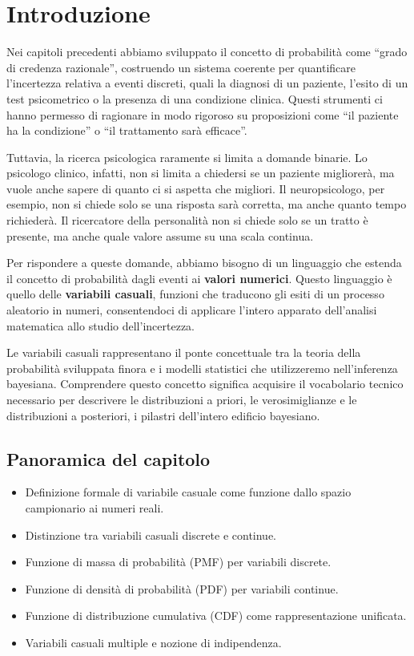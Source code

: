 \documentclass[
  letterpaper,
  DIV=11,
  numbers=noendperiod,
  oneside]{scrreprt}
\providecommand{\tightlist}{%
  \setlength{\itemsep}{0pt}\setlength{\parskip}{0pt}}
\theoremstyle{definition}
\theoremstyle{plain}
\theoremstyle{definition}
\theoremstyle{remark}
\begin{document}
\section*{Introduzione}\label{introduzione-6}


Nei capitoli precedenti abbiamo sviluppato il concetto di probabilità
come ``grado di credenza razionale'', costruendo un sistema coerente per
quantificare l'incertezza relativa a eventi discreti, quali la diagnosi
di un paziente, l'esito di un test psicometrico o la presenza di una
condizione clinica. Questi strumenti ci hanno permesso di ragionare in
modo rigoroso su proposizioni come ``il paziente ha la condizione'' o
``il trattamento sarà efficace''.

Tuttavia, la ricerca psicologica raramente si limita a domande binarie.
Lo psicologo clinico, infatti, non si limita a chiedersi se un paziente
migliorerà, ma vuole anche sapere di quanto ci si aspetta che migliori.
Il neuropsicologo, per esempio, non si chiede solo se una risposta sarà
corretta, ma anche quanto tempo richiederà. Il ricercatore della
personalità non si chiede solo se un tratto è presente, ma anche quale
valore assume su una scala continua.

Per rispondere a queste domande, abbiamo bisogno di un linguaggio che
estenda il concetto di probabilità dagli eventi ai \textbf{valori
numerici}. Questo linguaggio è quello delle \textbf{variabili casuali},
funzioni che traducono gli esiti di un processo aleatorio in numeri,
consentendoci di applicare l'intero apparato dell'analisi matematica
allo studio dell'incertezza.

Le variabili casuali rappresentano il ponte concettuale tra la teoria
della probabilità sviluppata finora e i modelli statistici che
utilizzeremo nell'inferenza bayesiana. Comprendere questo concetto
significa acquisire il vocabolario tecnico necessario per descrivere le
distribuzioni a priori, le verosimiglianze e le distribuzioni a
posteriori, i pilastri dell'intero edificio bayesiano.

\subsection*{Panoramica del capitolo}\label{panoramica-del-capitolo-5}

\begin{itemize}
\tightlist
\item
  Definizione formale di variabile casuale come funzione dallo spazio
  campionario ai numeri reali.
\item
  Distinzione tra variabili casuali discrete e continue.
\item
  Funzione di massa di probabilità (PMF) per variabili discrete.
\item
  Funzione di densità di probabilità (PDF) per variabili continue.
\item
  Funzione di distribuzione cumulativa (CDF) come rappresentazione
  unificata.
\item
  Variabili casuali multiple e nozione di indipendenza.
\end{itemize}
\end{document}
